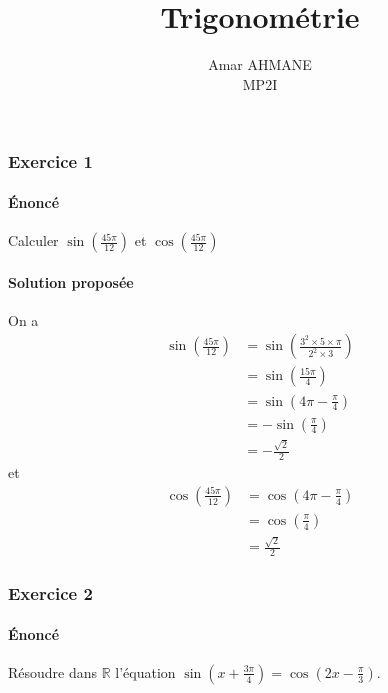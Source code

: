 \documentclass[14pt]{article}
\title{\huge\textbf{Trigonométrie}}
\author{Amar AHMANE\\ MP2I}
\date{}
\newcommand{\pr}[1]{\left(#1\right)}
\def\R{\mathbb R}
\begin{document}
    \maketitle
    \subsubsection*{Exercice 1}
    \paragraph{Énoncé} Calculer $\sin\pr{\frac{45\pi}{12}}$ et $\cos\pr{\frac{45\pi}{12}}$
    \paragraph{Solution proposée} On a
    \begin{align*}
        \sin\pr{\frac{45\pi}{12}} &= \sin\pr{\frac{3^2\times 5\times\pi}{2^2\times 3}}\\
                                  &= \sin\pr{\frac{15\pi}{4}}\\
                                  &= \sin\pr{4\pi-\frac{\pi}{4}}\\
                                  &= -\sin\pr{\frac\pi4}\\
                                  &= -\frac{\sqrt{2}}2
    \end{align*}
    et
    \begin{align*}
        \cos\pr{\frac{45\pi}{12}} &= \cos\pr{4\pi-\frac{\pi}{4}}\\
                                  &= \cos\pr{\frac\pi4}\\
                                  &= \frac{\sqrt{2}}2
    \end{align*}

    \subsubsection*{Exercice 2}
    \paragraph{Énoncé} Résoudre dans $\R$ l'équation $\sin\pr{x+\frac{3\pi}4}=\cos\pr{2x-\frac\pi3}$.
\end{document}

